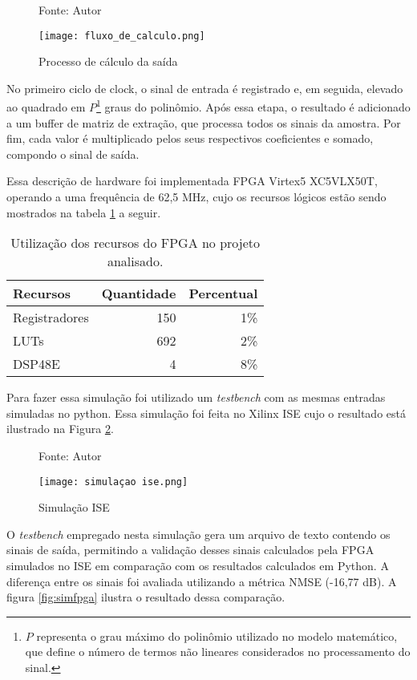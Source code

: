 \begin{figure}[H]
	\centering
	\captionsetup{justification=centering}
	\caption*{Fonte: Autor}
	\texttt{[image: fluxo\_de\_calculo.png]}
	\caption{Processo de cálculo da saída}
	\label{fig:diagramaprocesssimpl}
\end{figure}


No primeiro ciclo de clock, o sinal de entrada é registrado e, em seguida, elevado ao quadrado em \( P \)\footnote{\( P \) representa o grau máximo do polinômio utilizado no modelo matemático, que define o número de termos não lineares considerados no processamento do sinal.} graus do polinômio. Após essa etapa, o resultado é adicionado a um buffer de matriz de extração, que processa todos os sinais da amostra. Por fim, cada valor é multiplicado pelos seus respectivos coeficientes e somado, compondo o sinal de saída.  



Essa descrição de hardware foi implementada FPGA Virtex5 XC5VLX50T, operando a uma frequência de 62,5 MHz, cujo os recursos lógicos estão sendo mostrados na tabela \ref{tab:recursos_fpga} a seguir.

\begin{table}[htbp!]
	\centering
	\begin{tabular}{|l|r|r|}
		\hline
		Recursos & Quantidade & Percentual \\
		\hline
		Registradores & 150 & 1\% \\
		LUTs & 692 & 2\% \\
		DSP48E & 4 & 8\% \\
		\hline
	\end{tabular}
	\caption{Utilização dos recursos do FPGA no projeto analisado.}
	\label{tab:recursos_fpga}
\end{table}

Para fazer essa simulação foi utilizado um \textit{testbench} com as mesmas entradas simuladas no python. Essa simulação foi feita no Xilinx ISE cujo o resultado está ilustrado na Figura \ref{fig:simise}.

\begin{figure}[htbp!]
	\centering
	\captionsetup{justification=centering}
	\caption*{Fonte: Autor}
	\texttt{[image: simulaçao ise.png]}
	\caption{Simulação ISE}
	\label{fig:simise}
\end{figure}

O \textit{testbench} empregado nesta simulação gera um arquivo de texto contendo os sinais de saída, permitindo a validação desses sinais calculados pela FPGA simulados no ISE em comparação com os resultados calculados em Python.  A diferença entre os sinais foi avaliada utilizando a métrica NMSE (-16,77 dB). A figura \ref{fig:simfpga} ilustra o resultado dessa comparação.


